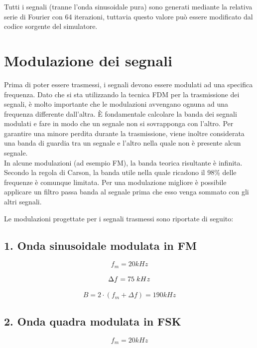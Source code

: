 \documentclass{article}
\begin{document}
Tutti i segnali (tranne l'onda sinusoidale pura) sono generati mediante la relativa serie di Fourier con 64 iterazioni,
tuttavia questo valore può essere modificato dal codice sorgente del simulatore.

\section{Modulazione dei segnali}
Prima di poter essere trasmessi, i segnali devono essere modulati ad una specifica frequenza. Dato che si sta utilizzando la
tecnica FDM per la trasmissione dei segnali, è molto importante che le modulazioni avvengano ognuna ad una frequenza differente
dall'altra. È fondamentale calcolare la banda dei segnali modulati e fare in modo che un segnale non si sovrapponga con l'altro.
Per garantire una minore perdita durante la trasmissione, viene inoltre considerata una banda di guardia tra un segnale e
l'altro nella quale non è presente alcun segnale.\\
In alcune modulazioni (ad esempio FM), la banda teorica risultante è infinita. Secondo la regola di Carson, la banda utile nella
quale ricadono il 98\% delle frequenze è comunque limitata. Per una modulazione migliore è possibile applicare un filtro
passa banda al segnale prima che esso venga sommato con gli altri segnali.

Le modulazioni progettate per i segnali trasmessi sono riportate di seguito:

\subsection{1. Onda sinusoidale modulata in FM}
\begin{equation}
    f_m = 20 kHz
\end{equation}

\begin{equation}
    \Delta f = 75 \hspace{0.1cm} kHz
\end{equation}

\begin{equation}
    B = 2 \cdot (f_m + \Delta f) = 190 kHz
\end{equation}

\subsection{2. Onda quadra modulata in FSK}
\begin{equation}
    f_m = 20 kHz
\end{equation}
\end{document}

